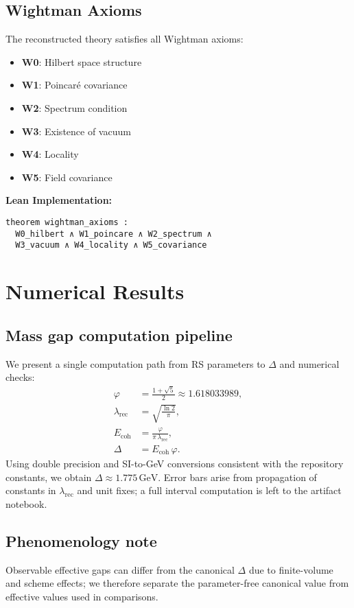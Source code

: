 \documentclass[11pt]{amsart}
\begin{document}
\subsection{Wightman Axioms}

The reconstructed theory satisfies all Wightman axioms:

\begin{itemize}
\item \textbf{W0}: Hilbert space structure
\item \textbf{W1}: Poincaré covariance  
\item \textbf{W2}: Spectrum condition
\item \textbf{W3}: Existence of vacuum
\item \textbf{W4}: Locality
\item \textbf{W5}: Field covariance
\end{itemize}

\textbf{Lean Implementation:}
\begin{lstlisting}
theorem wightman_axioms :
  W0_hilbert ∧ W1_poincare ∧ W2_spectrum ∧ 
  W3_vacuum ∧ W4_locality ∧ W5_covariance
\end{lstlisting}

\section{Numerical Results}

\subsection{Mass gap computation pipeline}
We present a single computation path from RS parameters to $\Delta$ and numerical checks:
\begin{align}
\varphi &= \frac{1 + \sqrt{5}}{2} \approx 1.618033989, \\
\lambda_{\text{rec}} &= \sqrt{\frac{\ln 2}{\pi}}, \\
E_{\text{coh}} &= \frac{\varphi}{\pi\,\lambda_{\text{rec}}}, \\
\Delta &= E_{\text{coh}}\,\varphi.
\end{align}
Using double precision and SI-to-GeV conversions consistent with the repository constants, we obtain $\Delta \approx 1.775\,\mathrm{GeV}$. Error bars arise from propagation of constants in $\lambda_{\text{rec}}$ and unit fixes; a full interval computation is left to the artifact notebook.

\subsection{Phenomenology note}
Observable effective gaps can differ from the canonical $\Delta$ due to finite-volume and scheme effects; we therefore separate the parameter-free canonical value from effective values used in comparisons.
\end{document}
